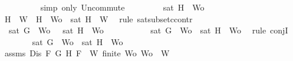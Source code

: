 \begin{isabellebody}
\ \ \ \ \ \ \ \ \isamarkupfalse%
\ {\isacharparenleft}simp\ only{\isacharcolon}\ Un{\isacharunderscore}commute{\isacharparenright}\isanewline
\ \ \ \ \ \ \isamarkupfalse%
\ {\isachardoublequoteopen}{\isasymnot}\ sat\ {\isacharparenleft}{\isacharbraceleft}H{\isacharbraceright}\ {\isasymunion}\ {\isacharquery}Wo{\isacharparenright}{\isachardoublequoteclose}\isanewline
\ \ \ \ \ \ \ \ \isamarkupfalse%
\ {\isacartoucheopen}{\isacharbraceleft}H{\isacharbraceright}\ {\isasymunion}\ W{}\ {\isasymsubseteq}\ {\isacharbraceleft}H{\isacharbraceright}\ {\isasymunion}\ {\isacharquery}Wo{\isacartoucheclose}\ {\isacartoucheopen}{\isasymnot}\ sat\ {\isacharparenleft}{\isacharbraceleft}H{\isacharbraceright}\ {\isasymunion}\ W{}{\isacharparenright}{\isacartoucheclose}\ \isamarkupfalse%
\ {\isacharparenleft}rule\ sat{\isacharunderscore}subset{\isacharunderscore}ccontr{\isacharparenright}\isanewline
\ \ \ \ \ \ \isamarkupfalse%
\ {\isachardoublequoteopen}{\isasymnot}\ sat\ {\isacharparenleft}{\isacharbraceleft}G{\isacharbraceright}\ {\isasymunion}\ {\isacharquery}Wo{\isacharparenright}\ {\isasymand}\ {\isasymnot}\ sat\ {\isacharparenleft}{\isacharbraceleft}H{\isacharbraceright}\ {\isasymunion}\ {\isacharquery}Wo{\isacharparenright}{\isachardoublequoteclose}\isanewline
\ \ \ \ \ \ \ \ \isamarkupfalse%
\ {\isacartoucheopen}{\isasymnot}\ sat\ {\isacharparenleft}{\isacharbraceleft}G{\isacharbraceright}\ {\isasymunion}\ {\isacharquery}Wo{\isacharparenright}{\isacartoucheclose}\ {\isacartoucheopen}{\isasymnot}\ sat\ {\isacharparenleft}{\isacharbraceleft}H{\isacharbraceright}\ {\isasymunion}\ {\isacharquery}Wo{\isacharparenright}{\isacartoucheclose}\ \isamarkupfalse%
\ {\isacharparenleft}rule\ conjI{\isacharparenright}\isanewline
\ \ \ \ \ \ \isamarkupfalse%
\ {\isachardoublequoteopen}sat\ {\isacharparenleft}{\isacharbraceleft}G{\isacharbraceright}\ {\isasymunion}\ {\isacharquery}Wo{\isacharparenright}\ {\isasymor}\ sat\ {\isacharparenleft}{\isacharbraceleft}H{\isacharbraceright}\ {\isasymunion}\ {\isacharquery}Wo{\isacharparenright}{\isachardoublequoteclose}\isanewline
\ \ \ \ \ \ \ \ \isamarkupfalse%
\ assms{\isacharparenleft}{}{\isacharparenright}\ {\isacartoucheopen}Dis\ F\ G\ H{\isacartoucheclose}\ {\isacartoucheopen}F\ {\isasymin}\ W{\isacartoucheclose}\ {\isacartoucheopen}finite\ {\isacharquery}Wo{\isacartoucheclose}\ {\isacartoucheopen}{\isacharquery}Wo\ {\isasymsubseteq}\ W{\isacartoucheclose}\ \isamarkupfalse%

\end{isabellebody}
